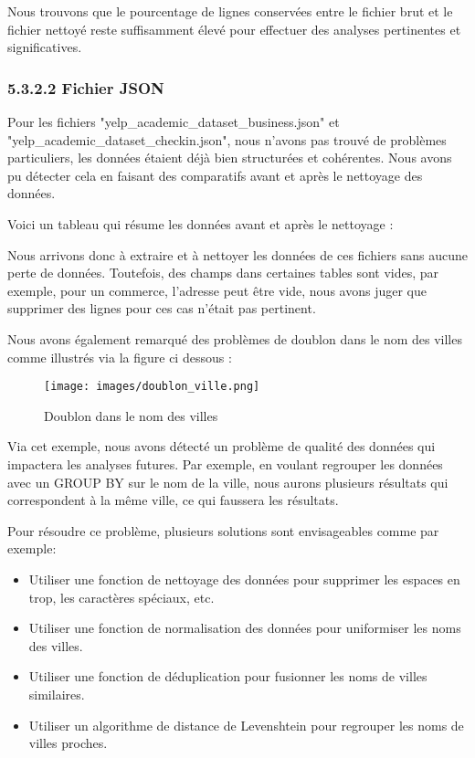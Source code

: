 \begin{itemize}
Nous trouvons que le pourcentage de lignes conservées entre le fichier brut et le fichier nettoyé reste suffisamment élevé pour effectuer des analyses pertinentes et significatives.


\subsubsection{5.3.2.2 Fichier JSON}

Pour les fichiers "yelp_academic_dataset_business.json" et "yelp_academic_dataset_checkin.json", nous n'avons pas trouvé de problèmes particuliers, les données étaient déjà bien structurées et cohérentes.
Nous avons pu détecter cela en faisant des comparatifs avant et après le nettoyage des données.

Voici un tableau qui résume les données avant et après le nettoyage :

Nous arrivons donc à extraire et à nettoyer les données de ces fichiers sans aucune perte de données. Toutefois, des champs dans certaines tables sont vides, par exemple, pour un commerce,
l'adresse peut être vide, nous avons juger que supprimer des lignes pour ces cas n'était pas pertinent.

Nous avons également remarqué des problèmes de doublon dans le nom des villes comme illustrés via la figure ci dessous :

\begin{figure}[h]
\centering
\texttt{[image: images/doublon\_ville.png]}
\caption{Doublon dans le nom des villes}
\end{figure}

Via cet exemple, nous avons détecté un problème de qualité des données qui impactera les analyses futures.
Par exemple, en voulant regrouper les données avec un GROUP BY sur le nom de la ville, nous aurons plusieurs résultats qui correspondent à la même ville, ce qui faussera les résultats.

Pour résoudre ce problème, plusieurs solutions sont envisageables comme par exemple:

\begin{itemize}
\item Utiliser une fonction de nettoyage des données pour supprimer les espaces en trop, les caractères spéciaux, etc.
\item Utiliser une fonction de normalisation des données pour uniformiser les noms des villes.
\item Utiliser une fonction de déduplication pour fusionner les noms de villes similaires.
\item Utiliser un algorithme de distance de Levenshtein pour regrouper les noms de villes proches.
\end{itemize}


\end{itemize}
